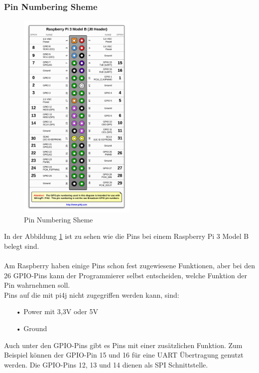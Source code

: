 \newpage

\subsubsection{Pin Numbering Sheme}

\begin{figure}
\vspace{-35pt}
  \begin{center}
    \includegraphics[width=0.50\textwidth]{Bilder/pi4j/PinNumberingSheme}
  \end{center}
  \caption[Pin Numbering Sheme]{Pin Numbering Sheme\protect\footnotemark}
  \label{Pin Numbering Sheme}
  \vspace{-120pt}
\end{figure}


In der Abbildung \ref{Pin Numbering Sheme} ist zu sehen wie die Pins bei einem Raspberry Pi 3 Model B belegt sind.
\\ \\
Am Raspberry haben einige Pins schon fest zugewiesene Funktionen, aber bei den 26 \ac{GPIO}-Pins kann der Programmierer selbst entscheiden, welche Funktion der Pin wahrnehmen soll.
\\Pins auf die mit \ac{pi4j} nicht zugegriffen werden kann, sind:
\begin{itemize}
\item[•] Power mit 3,3V oder 5V
\item[•] Ground
\end{itemize}
\vspace{10pt}
Auch unter den \ac{GPIO}-Pins gibt es Pins mit einer zusätzlichen Funktion. Zum Beispiel können der \ac{GPIO}-Pin 15 und 16 für eine \ac{UART} Übertragung genutzt werden. Die \ac{GPIO}-Pins 12, 13 und 14 dienen als \ac{SPI} Schnittstelle.

